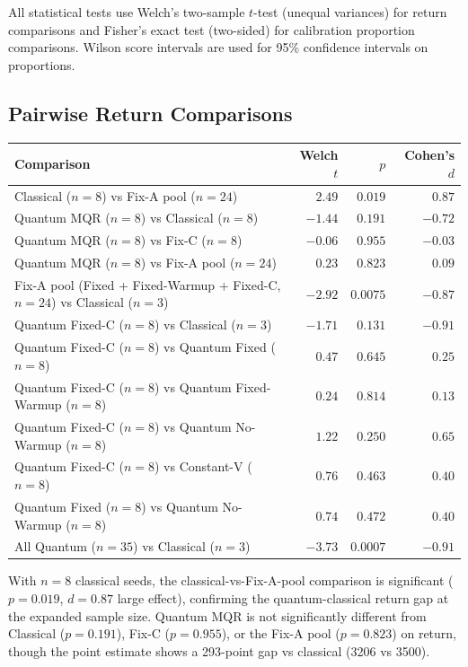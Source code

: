 \documentclass[10pt,a4paper]{article}
\begin{document}
All statistical tests use Welch's two-sample $t$-test (unequal variances) for
return comparisons and Fisher's exact test (two-sided) for calibration
proportion comparisons. Wilson score intervals are used for 95\% confidence
intervals on proportions.

\subsection{Pairwise Return Comparisons}

\begin{center}
\setlength{\tabcolsep}{8pt}
\begin{tabular}{lrrr}
\toprule
Comparison & Welch $t$ & $p$ & Cohen's $d$ \\
\midrule
Classical ($n=8$) vs Fix-A pool ($n=24$)
           & $2.49$ & $\mathbf{0.019}$ & $0.87$ \\[4pt]
Quantum MQR ($n=8$) vs Classical ($n=8$)
           & $-1.44$ & $0.191$ & $-0.72$ \\[4pt]
Quantum MQR ($n=8$) vs Fix-C ($n=8$)
           & $-0.06$ & $0.955$ & $-0.03$ \\[4pt]
Quantum MQR ($n=8$) vs Fix-A pool ($n=24$)
           & $0.23$ & $0.823$ & $0.09$ \\[4pt]
Fix-A pool (Fixed + Fixed-Warmup + Fixed-C, $n=24$) vs Classical ($n=3$)
           & $-2.92$ & $\mathbf{0.0075}$ & $-0.87$ \\[4pt]
Quantum Fixed-C ($n=8$) vs Classical ($n=3$)
           & $-1.71$ & $0.131$ & $-0.91$ \\[4pt]
Quantum Fixed-C ($n=8$) vs Quantum Fixed ($n=8$)
           & $0.47$ & $0.645$ & $0.25$ \\[4pt]
Quantum Fixed-C ($n=8$) vs Quantum Fixed-Warmup ($n=8$)
           & $0.24$ & $0.814$ & $0.13$ \\[4pt]
Quantum Fixed-C ($n=8$) vs Quantum No-Warmup ($n=8$)
           & $1.22$ & $0.250$ & $0.65$ \\[4pt]
Quantum Fixed-C ($n=8$) vs Constant-V ($n=8$)
           & $0.76$ & $0.463$ & $0.40$ \\[4pt]
Quantum Fixed ($n=8$) vs Quantum No-Warmup ($n=8$)
           & $0.74$ & $0.472$ & $0.40$ \\[4pt]
All Quantum ($n=35$) vs Classical ($n=3$)
           & $-3.73$ & $\mathbf{0.0007}$ & $-0.91$ \\
\bottomrule
\end{tabular}
\end{center}

With $n=8$ classical seeds, the classical-vs-Fix-A-pool comparison is significant
($p=0.019$, $d=0.87$ large effect), confirming the quantum-classical return gap
at the expanded sample size. Quantum MQR is not significantly different from
Classical ($p=0.191$), Fix-C ($p=0.955$), or the Fix-A pool ($p=0.823$) on
return, though the point estimate shows a 293-point gap vs classical (3206 vs 3500).
\end{document}
